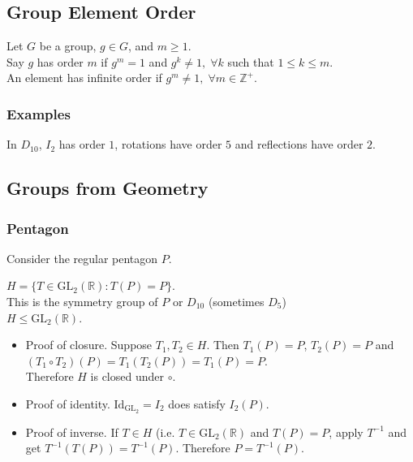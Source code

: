 \documentclass[11pt]{article}
\newcommand{\0}{\emptyset}
\newcommand{\Z}{\mathbb{Z}}
\newcommand{\R}{\mathbb{R}}
\begin{document}
\subsection*{Group Element Order}
\label{sec:orgb5ca3e4}
Let \(G\) be a group, \(g\in G\), and \(m\geq 1\).\\[0pt]
Say \(g\) has order \(m\) if \(g^{m}=1\) and \(g^{k}\neq 1,\;\forall k\) such that \(1\leq k\leq m\).\\[0pt]
An element has infinite order if \(g^{m}\neq1,\;\forall m\in\Z^{+}\).\\[0pt]
\subsubsection*{Examples}
\label{sec:org8af9cfc}
In \(D_{10}\), \(I_{2}\) has order \(1\), rotations have order \(5\) and reflections have order \(2\).\\[0pt]
\subsection*{Groups from Geometry}
\label{sec:orgfca80ca}
\subsubsection*{Pentagon}
\label{sec:org2196a9f}
Consider the regular pentagon \(P\).\\[0pt]


\(H=\{T\in\text{GL}_{2}(\R):T(P)=P\}\).\\[0pt]
This is the symmetry group of \(P\) or \(D_{10}\) (sometimes \(D_{5}\))\\[0pt]
\(H\leq\text{GL}_{2}(\R)\).\\[0pt]
\begin{itemize}
\item Proof of closure.
\label{sec:org6ae8d27}
Suppose \(T_{1},T_{2}\in H\). Then \(T_{1}(P)=P\), \(T_{2}(P)=P\) and \((T_{1}\circ T_{2})(P)=T_{1}(T_{2}(P))=T_{1}(P)=P\).\\[0pt]
Therefore \(H\) is closed under \(\circ\).\\[0pt]
\item Proof of identity.
\label{sec:org0079194}
\(\text{Id}_{\text{GL}_{2}}=I_{2}\) does satisfy \(I_{2}(P)\).\\[0pt]
\item Proof of inverse.
\label{sec:orgc8d5515}
If \(T\in H\) (i.e. \(T\in\text{GL}_{2}(\R)\) and \(T(P)=P\), apply \(T^{-1}\) and get \(T^{-1}(T(P))=T^{-1}(P)\). Therefore \(P=T^{-1}(P)\).\\[0pt]
\end{itemize}
\end{document}
